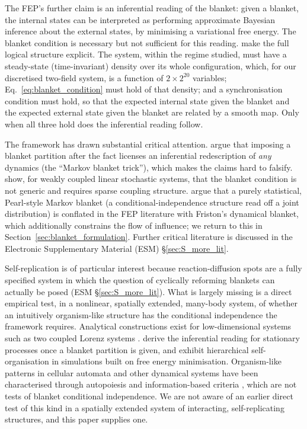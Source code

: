 \documentclass[11pt]{article}
\begin{document}
The FEP's further claim is an inferential reading of the blanket: given a blanket, the internal states can be interpreted as performing approximate Bayesian inference about the external states, by minimising a variational free energy. The blanket condition is necessary but not sufficient for this reading. \citet{Friston2023Simpler} make the full logical structure explicit. The system, within the regime studied, must have a steady-state (time-invariant) density over its whole configuration, which, for our discretised two-field system, is a function of $2\times2^{20}$ variables; Eq.~\ref{eq:blanket_condition} must hold of that density; and a synchronisation condition must hold, so that the expected internal state given the blanket and the expected external state given the blanket are related by a smooth map. Only when all three hold does the inferential reading follow.

The framework has drawn substantial critical attention. \citet{Raja2021} argue that imposing a blanket partition after the fact licenses an inferential redescription of \emph{any} dynamics (the ``Markov blanket trick''), which makes the claims hard to falsify. \citet{Aguilera2022} show, for weakly coupled linear stochastic systems, that the blanket condition is not generic and requires sparse coupling structure. \citet{Bruineberg2022} argue that a purely statistical, Pearl-style Markov blanket \citep{Pearl1988} (a conditional-independence structure read off a joint distribution) is conflated in the FEP literature with Friston's dynamical blanket, which additionally constrains the flow of influence; we return to this in Section~\ref{sec:blanket_formulation}. Further critical literature is discussed in the Electronic Supplementary Material (ESM) \S\ref{sec:S_more_lit}.

Self-replication is of particular interest because reaction-diffusion spots are a fully specified system in which the question of cyclically reforming blankets can actually be posed (ESM \S\ref{sec:S_more_lit}). What is largely missing is a direct empirical test, in a nonlinear, spatially extended, many-body system, of whether an intuitively organism-like structure has the conditional independence the framework requires. Analytical constructions exist for low-dimensional systems such as two coupled Lorenz systems \citep{Friston2021Stochastic}. \citet{DaCosta2021} derive the inferential reading for stationary processes once a blanket partition is given, and \citet{Palacios2020} exhibit hierarchical self-organisation in simulations built on free energy minimisation. Organism-like patterns in cellular automata and other dynamical systems have been characterised through autopoiesis and information-based criteria \citep{Beer2015,Beer2020,Biehl2016}, which are not tests of blanket conditional independence. We are not aware of an earlier direct test of this kind in a spatially extended system of interacting, self-replicating structures, and this paper supplies one.
\end{document}
